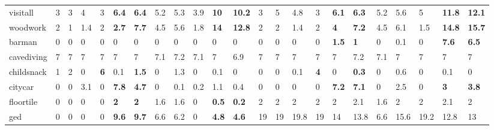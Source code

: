 \begin{table*}[htb]
\begin{tabularx}{\linewidth}{l|*{2}{XXX|XXX|XX|XXX|}}
visitall        & 3          & 3          & 4        & 3             & \textbf{6.4}  & \textbf{6.4}  & 5.2     & 5.3     & 3.9           & \textbf{10}   & \textbf{10.2}  & 3          & 5          & 4.8      & 3             & \textbf{6.1}  & \textbf{6.3}  & 5.2     & 5.6     & 5             & \textbf{11.8} & \textbf{12.1}  \\ 
woodwork        & 2          & 1          & 1.4      & 2             & \textbf{2.7}  & \textbf{7.7}  & 4.5     & 5.6     & 1.8           & \textbf{14}   & \textbf{12.8}  & 2          & 2          & 1.4      & 2             & \textbf{4}    & \textbf{7.2}  & 4.5     & 6.1     & 1.5           & \textbf{14.8} & \textbf{15.7}  \\ 
\hline
barman          & 0          & 0          & 0        & 0             & 0             & 0             & 0       & 0       & 0             & 0             & 0              & 0          & 0          & 0        & 0             & \textbf{1.5}  & \textbf{1}    & 0       & 0.1     & 0             & \textbf{7.6}  & \textbf{6.5}   \\ 
cavediving      & 7          & 7          & 7        & 7             & 7             & 7             & 7.1     & 7.2     & 7.1           & 7             & 6.9            & 7          & 7          & 7        & 7             & 7             & 7.2           & 7.1     & 7       & 7             & 7             & 7              \\ 
childsnack      & 1          & 2          & 0        & \textbf{6}    & 0.1           & \textbf{1.5}  & 0       & 1.3     & 0             & 0.1           & 0              & 0          & 0          & 0.1      & \textbf{4}    & 0             & \textbf{0.3}  & 0       & 0.6     & 0             & 0.1           & 0              \\ 
citycar         & 0          & 0          & 3.1      & 0             & \textbf{7.8}  & \textbf{4.7}  & 0       & 0.1     & 0.2           & 1.1           & 0.4            & 0          & 0          & 0        & 0             & \textbf{7.2}  & \textbf{7.1}  & 0       & 2.5     & 0             & \textbf{3}    & \textbf{3.8}   \\ 
floortile       & 0          & 0          & 0        & 0             & \textbf{2}    & \textbf{2}    & 1.6     & 1.6     & 0             & \textbf{0.5}  & \textbf{0.2}   & 2          & 2          & 2        & 2             & 2             & 2.1           & 1.6     & 2       & 2             & 2.1           & 2              \\ 
ged             & 0          & 0          & 0        & 0             & \textbf{9.6}  & \textbf{9.7}  & 6.6     & 6.2     & 0             & \textbf{4.8}  & \textbf{4.6}   & 19         & 19         & 19.8     & 19            & 14            & 13.8          & 6.6     & 15.6    & 19.2          & 12.8          & 13             \\ 

\end{tabularx}
\end{table*}
